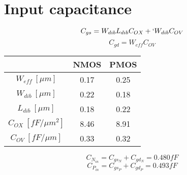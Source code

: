 \section{Input capacitance}

$$ C_{gs} = W_{dib} L_{dib} C_{OX} +`W_{dib}C_{OV}$$
%
$$ C_{gd} = W_{eff}C_{OV} $$

\iffalse
$$ W_{eff_N} = 0.17 ~\mu m$$
$$ W_{dib_N} = 0.22 $$
$$ L_{dib_N} = 0.18 $$
$$ C_{OX_N} = 8.46 ~fF/\mu m^2 $$
$$ C_{OV_N} = 0.33 ~fF/\mu m $$

$$ W_{eff_P} = 0.25 ~\mu m$$
$$ W_{dib_P} = 0.18 $$
$$ L_{dib_P} = 0.22 $$
$$ C_{OX_P} = 8.91 ~fF/\mu m^2 $$
$$ C_{OV_P} = 0.32 ~fF/\mu m $$
\fi

\begin{table}[!h]
	\centering
	\begin{tabular}{ccc}
		\hline
								&	NMOS	&	PMOS \\
		\hline
		$W_{eff}~[\mu m]$		&	0.17	&	0.25 \\
		$W_{dib}~[\mu m]$		&	0.22	&	0.18 \\
		$L_{dib}~[\mu m]$		&	0.18	&	0.22 \\
		$C_{OX}~[fF/\mu m^2]$		&	8.46	&	8.91 \\
		$C_{OV}~[fF/\mu m]$		&	0.33	&	0.32 \\
		\hline
	\end{tabular}
\end{table}

$$ C_{N_{in}} = C_{gs_N} + C_{gd_N} = 0.480 fF $$
$$ C_{P_{in}} = C_{gs_P} + C_{gd_P} = 0.493 fF $$

